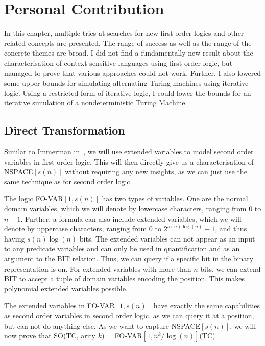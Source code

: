 \chapter{Personal Contribution}\label{ch:personal-contribution}

In this chapter, multiple tries at searches for new first order logics and other related concepts are presented.
The range of success as well as the range of the concrete themes are broad.
I did not find a fundamentally new result about the characterisation of context-sensitive languages using first order logic, but managed to prove that various approaches could not work.
Further, I also lowered some upper bounds for simulating alternating Turing machines using iterative logic.
Using a restricted form of iterative logic, I could lower the bounds for an iterative simulation of a nondeterministic Turing Machine.

\section{Direct Transformation}\label{sec:direct-transformation}

Similar to Immerman in~\cite{descriptive-complexity}, we will use extended variables to model second order variables in first order logic.
This will then directly give us a characterisation of NSPACE$[s(n)]$ without requiring any new insights, as we can just use the same technique as for second order logic.

\begin{define}
    The logic FO-VAR$[1, s(n)]$ has two types of variables.
    One are the normal domain variables, which we will denote by lowercase characters, ranging from $0$ to $n - 1$.
    Further, a formula can also include extended variables, which we will denote by uppercase characters, ranging from $0$ to $2^{s(n)\log(n)} - 1$, and thus having $s(n)\log(n)$ bits.
    The extended variables can not appear as an input to any predicate variables and can only be used in quantification and as an argument to the BIT relation.
    Thus, we can query if a specific bit in the binary representation is on.
    For extended variables with more than $n$ bits, we can extend BIT to accept a tuple of domain variables encoding the position.
    This makes polynomial extended variables possible.
\end{define}

The extended variables in FO-VAR$[1, s(n)]$ have exactly the same capabilities as second order variables in second order logic, as we can query it at a position, but can not do anything else.
As we want to capture NSPACE$[s(n)]$, we will now prove that SO(TC, arity $k$) = FO-VAR$[1, n^k/\log(n)]$(TC).

